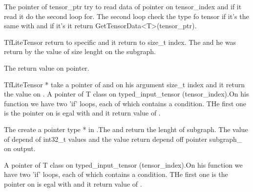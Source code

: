 The pointer of tensor\_ptr try to read data of pointer on tensor\_index and if it read it do the second loop for. The second loop check the type fo tensor if it's the same  with  and if it's it return GetTensorData<T>(tensor\_ptr).

\begin{center}
    \label{Figure:MicroErrorRep}
\end{center}

TfLiteTensor return to specific and it return to size\_t index. The  and he was return by the value of size lenght on the subgraph.

The  return value on pointer. 

TfLiteTensor * take a pointer of  and on his argument size\_t index and it return the value on .
A pointer of T class on typed\_input\_tensor (tensor\_index).On his function we have two 'if' loops, each of which contains a condition. 
THe first one is the pointer on  is egal with  and it return value of .

\begin{center}
    \label{Figure:MicroErrorRep}
\end{center}

The create a pointer type * in .The  and return the lenght of subgraph. 
The  value of  depend of int32\_t values and the value return depend off pointer subgraph\_ on output. 

A pointer of T class on typed\_input\_tensor (tensor\_index).On his function we have two 'if' loops, each of which contains a condition. 
THe first one is the pointer on  is egal with  and it return value of .

\begin{center}
    \label{Figure:MicroErrorRep}
\end{center}


